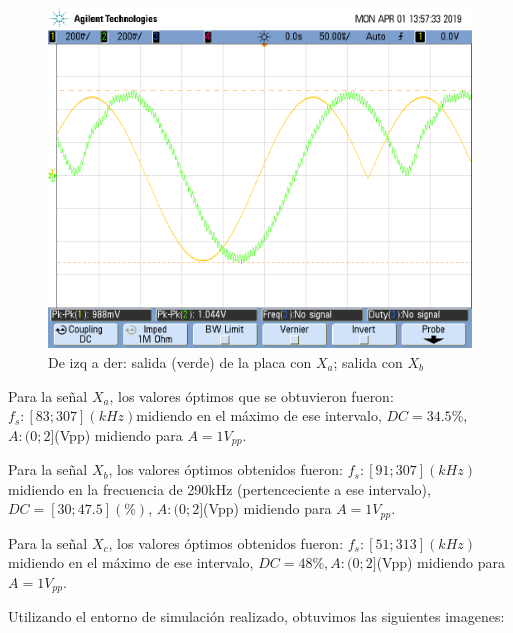 \documentclass[../../ASSD_TP1_G7.tex]{subfiles}
\begin{document}
\begin{figure}[H]
\centering{}\includegraphics[scale=0.25]{Imagenes/ej_6_a_syh}\caption{De izq a der: salida (verde) de la placa con $X_{a}$; salida con
$X_{b}$}
\end{figure}

Para la señal $X_{a}$, los valores óptimos que se obtuvieron fueron:
$f_{s}:[83;307](kHz)$midiendo en el máximo de ese intervalo, $DC=34.5\%,$$A:(0;2]$(Vpp)
midiendo para $A=1V_{pp}$.

Para la señal $X_{b}$, los valores óptimos obtenidos fueron: $f_{s}:[91;307](kHz)$
midiendo en la frecuencia de 290kHz (pertenceciente a ese intervalo),
$DC=[30;47.5](\%)$, $A:(0;2]$(Vpp) midiendo para $A=1V_{pp}$.

Para la señal $X_{c}$, los valores óptimos obtenidos fueron: $f_{s}:[51;313](kHz)$midiendo
en el máximo de ese intervalo, $DC=48\%,$$A:(0;2]$(Vpp) midiendo
para $A=1V_{pp}$.

Utilizando el entorno de simulación realizado, obtuvimos las siguientes
imagenes:
\end{document}
